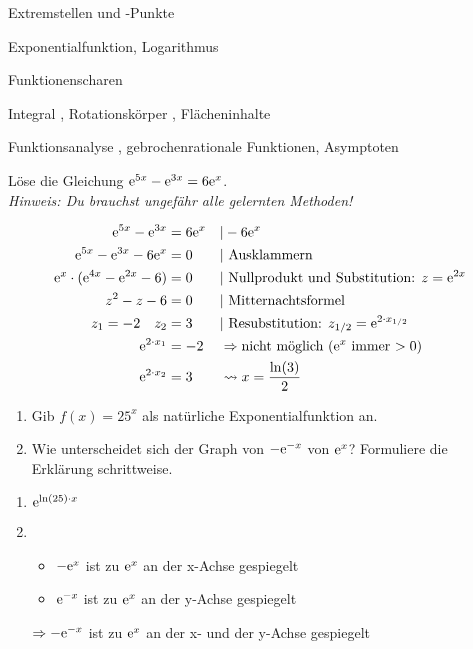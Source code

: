 


\begin{inhalt}
	\item Extremstellen und -Punkte 
	\item Exponentialfunktion, Logarithmus 
	\item Funktionenscharen 
  \item Integral , Rotationskörper , Flächeninhalte 
	\item Funktionsanalyse , gebrochenrationale Funktionen, Asymptoten 
\end{inhalt}

Löse die Gleichung $\mathrm{e}^{5x}-\mathrm{e}^{3x}=6\mathrm{e}^x$.\\
\textit{Hinweis: Du brauchst ungefähr alle gelernten Methoden!}
\begin{lsg}{}
	\begin{multicols}{2}
	\begin{align*}
		\e^{5x}-\e^{3x}&=6\e^x &&|-6\e^x\\
		\e^{5x}-\e^{3x}-6\e^x&=0 &&|\ \text{Ausklammern}\\
		\e^x\cdot(\e^{4x}-\e^{2x}-6)&=0 &&|\ \text{Nullprodukt und Substitution: } z=\e^{2x}\\
		z^2-z-6&=0 &&|\ \text{Mitternachtsformel}\\
		z_1=-2 \quad z_2&=3&&|\ \text{Resubstitution: } z_{1/2}=\e^{2\cdot x_{1/2}}\\
		\e^{2\cdot x_1}&=-2 &&\Rightarrow \text{nicht möglich ($\e^x$ immer $>0$)}\\
		\e^{2\cdot x_2}&= 3 &&\rightsquigarrow x=\frac{\ln(3)}{2}
	\end{align*}
	\end{multicols}
\end{lsg}

\begin{enumerate}
	\item Gib $f(x)=25^x$ als natürliche Exponentialfunktion an.
	\item	Wie unterscheidet sich der Graph von $-\mathrm{e}^{-x}$ von $\mathrm{e}^x$? Formuliere die Erklärung schrittweise.
\end{enumerate}
\begin{lsg}{}
	\begin{enumerate}
		\item $\mathrm{e}^{\ln(25)\cdot x}$
		\item 	\begin{itemize}
					\item $-\mathrm{e}^x$ ist zu $ \mathrm{e}^x$ an der x-Achse gespiegelt
					\item $\mathrm{e}^{-x}$ ist zu $\mathrm{e}^x$ an der y-Achse gespiegelt
				\end{itemize}
				$\Rightarrow -\mathrm{e}^{-x}$ ist zu $\mathrm{e}^x$ an der x- und der y-Achse gespiegelt
	\end{enumerate}
\end{lsg}


